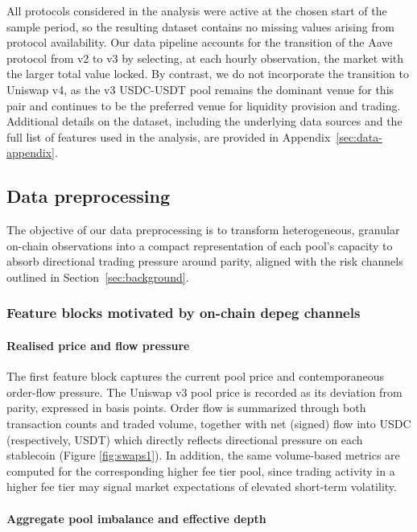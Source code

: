 \documentclass[a4paper,fleqn]{cas-sc}
\begin{document}
All protocols considered in the analysis were active at the chosen start of the sample period, so the resulting dataset contains no missing values arising from protocol availability. Our data pipeline accounts for the transition of the Aave protocol from v2 to v3 by selecting, at each hourly observation, the market with the larger total value locked. By contrast, we do not incorporate the transition to Uniswap v4, as the v3 USDC-USDT pool remains the dominant venue for this pair and continues to be the preferred venue for liquidity provision and trading. Additional details on the dataset, including the underlying data sources and the full list of features used in the analysis, are provided in Appendix~\ref{sec:data-appendix}.


\subsection{Data preprocessing}
\label{sec:data_processing}

The objective of our data preprocessing is to transform heterogeneous, granular on-chain observations into a compact representation of each pool’s capacity to absorb directional trading pressure around parity, aligned with the risk channels outlined in Section~\ref{sec:background}.

\subsubsection{Feature blocks motivated by on-chain depeg channels}

\paragraph{Realised price and flow pressure}
The first feature block captures the current pool price and contemporaneous order-flow pressure. The Uniswap v3 pool price is recorded as its deviation from parity, expressed in basis points. Order flow is summarized through both transaction counts and traded volume, together with net (signed) flow into USDC (respectively, USDT) which directly reflects directional pressure on each stablecoin (Figure \ref{fig:swaps1}). In addition, the same volume-based metrics are computed for the corresponding higher fee tier pool, since trading activity in a higher fee tier may signal market expectations of elevated short-term volatility.

\paragraph{Aggregate pool imbalance and effective depth} \label{sec:liq_imbalance}
\end{document}
